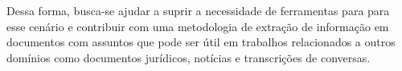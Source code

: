 



%
















Dessa forma, busca-se ajudar a suprir a necessidade de ferramentas para para esse cenário e contribuir com uma metodologia de extração de informação em documentos com assuntos que pode ser útil em trabalhos relacionados a outros domínios como documentos jurídicos, notícias e transcrições de conversas.







